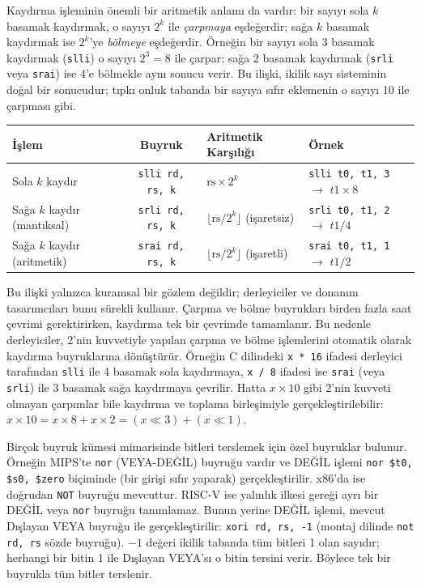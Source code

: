 Kaydırma işleminin önemli bir aritmetik anlamı da vardır: bir sayıyı sola $k$ basamak kaydırmak, o sayıyı $2^k$ ile \emph{çarpmaya} eşdeğerdir; sağa $k$ basamak kaydırmak ise $2^k$'ye \emph{bölmeye} eşdeğerdir. Örneğin bir sayıyı sola 3 basamak kaydırmak (\texttt{slli}) o sayıyı $2^3 = 8$ ile çarpar; sağa 2 basamak kaydırmak (\texttt{srli} veya \texttt{srai}) ise 4'e bölmekle aynı sonucu verir. Bu ilişki, ikilik sayı sisteminin doğal bir sonucudur; tıpkı onluk tabanda bir sayıya sıfır eklemenin o sayıyı 10 ile çarpması gibi.

\begin{center}
\small
\begin{tabular}{l c l l}
\toprule
\textbf{İşlem} & \textbf{Buyruk} & \textbf{Aritmetik Karşılığı} & \textbf{Örnek} \\
\midrule
Sola $k$ kaydır & \texttt{slli rd, rs, k} & $\text{rs} \times 2^k$ & \texttt{slli t0, t1, 3} $\rightarrow$ $t1 \times 8$ \\
Sağa $k$ kaydır (mantıksal) & \texttt{srli rd, rs, k} & $\lfloor\text{rs} / 2^k\rfloor$ (işaretsiz) & \texttt{srli t0, t1, 2} $\rightarrow$ $t1 / 4$ \\
Sağa $k$ kaydır (aritmetik) & \texttt{srai rd, rs, k} & $\lfloor\text{rs} / 2^k\rfloor$ (işaretli) & \texttt{srai t0, t1, 1} $\rightarrow$ $t1 / 2$ \\
\bottomrule
\end{tabular}
\end{center}

Bu ilişki yalnızca kuramsal bir gözlem değildir; derleyiciler ve donanım tasarımcıları bunu sürekli kullanır. Çarpma ve bölme buyrukları birden fazla saat çevrimi gerektirirken, kaydırma tek bir çevrimde tamamlanır. Bu nedenle derleyiciler, 2'nin kuvvetiyle yapılan çarpma ve bölme işlemlerini otomatik olarak kaydırma buyruklarına dönüştürür. Örneğin C dilindeki \texttt{x * 16} ifadesi derleyici tarafından \texttt{slli} ile 4 basamak sola kaydırmaya, \texttt{x / 8} ifadesi ise \texttt{srai} (veya \texttt{srli}) ile 3 basamak sağa kaydırmaya çevrilir. Hatta $x \times 10$ gibi 2'nin kuvveti olmayan çarpımlar bile kaydırma ve toplama birleşimiyle gerçekleştirilebilir: $x \times 10 = x \times 8 + x \times 2 = (x \ll 3) + (x \ll 1)$.

\begin{bilginot}
Birçok buyruk kümesi mimarisinde bitleri terslemek için özel buyruklar bulunur. Örneğin MIPS'te \texttt{nor} (VEYA-DEĞİL) buyruğu vardır ve DEĞİL işlemi \texttt{nor \$t0, \$s0, \$zero} biçiminde (bir girişi sıfır yaparak) gerçekleştirilir. x86'da ise doğrudan \texttt{NOT} buyruğu mevcuttur. RISC-V ise yalınlık ilkesi gereği ayrı bir DEĞİL veya \texttt{nor} buyruğu tanımlamaz. Bunun yerine DEĞİL işlemi, mevcut Dışlayan VEYA buyruğu ile gerçekleştirilir: \texttt{xori rd, rs, -1} (montaj dilinde \texttt{not rd, rs} sözde buyruğu). $-1$ değeri ikilik tabanda tüm bitleri 1 olan sayıdır; herhangi bir bitin 1 ile Dışlayan VEYA'sı o bitin tersini verir. Böylece tek bir buyrukla tüm bitler terslenir.
\end{bilginot}


